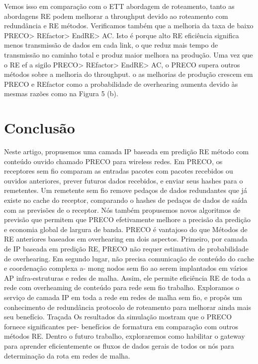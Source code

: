 \documentclass[12pt]{article}
\begin{document}
\begin{enumerate}
\begin{enumerate}
Vemos isso em comparação com o ETT
abordagem de roteamento, tanto as abordagens RE podem melhorar a
throughput devido ao roteamento com redundância e RE
métodos. Verificamos também que a melhoria da taxa de
baixo PRECO> REfactor> EndRE> AC. Isto é porque alto
RE eficiência significa menos transmissão de dados em cada link,
o que reduz mais tempo de transmissão no caminho total e
produz maior melhora na produção. Uma vez que o RE ef
a sigilo PRECO> REfactor> EndRE> AC, o PRECO
supera outros métodos sobre a melhoria do throughput. o
as melhorias de produção crescem em PRECO e REfactor como
a probabilidade de overhearing aumenta devido às mesmas razões
como na Figura 5 (b).
	\end{enumerate}
\end{enumerate}
 
 \section{Conclusão}
 
 Neste artigo, propusemos uma camada IP baseada em predição RE
 método com conteúdo ouvido chamado PRECO para wireless
 redes. Em PRECO, os receptores sem fio comparam as entradas
 pacotes com pacotes recebidos ou ouvidos anteriores, prever
 futuros dados recebidos, e enviar seus hashes para o
 remetentes. Um remetente sem fio remove pedaços de dados redundantes
 que já existe no cache do receptor, comparando o
 hashes de pedaços de dados de saída com as previsões de
 o receptor. Nós também propusemos novos algoritmos de previsão
 que permitem que PRECO efetivamente melhore a precisão da predição
 e economia global de largura de banda. PRECO é vantajoso do que
 Métodos de RE anteriores baseados em overhearing em dois aspectos. Primeiro,
 por camada de IP baseada em predição RE, PRECO não requer
 estimativa de probabilidade de overhearing. Em segundo lugar, não precisa
 comunicação de conteúdo do cache e coordenação complexa a-
 mong nodos sem fio ao serem implantados em vários AP
 infra-estruturas e redes de malha. Assim, ele permite eficiência
 RE de toda a rede com overheaming de conteúdo para rede sem fio
 trabalho. Exploramos o serviço de camada IP em toda a rede em
 redes de malha sem fio, e propôs um conhecimento de redundância
 protocolo de roteamento para melhorar ainda mais seu benefício. Traçada
 Os resultados da simulação mostram que o PRECO fornece significantes per-
 benefícios de formatura em comparação com outros métodos RE. Dentro
 o futuro trabalho, exploraremos como habilitar o gateway
 para aprender eficientemente os fluxos de dados gerais de todos os nós para
 determinação da rota em redes de malha.
\end{document}
